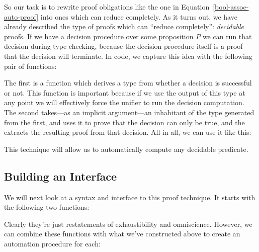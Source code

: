 So our task is to rewrite proof obligations like the one in
Equation~\ref{bool-assoc-auto-proof} into ones which can reduce completely. 
As it turns out, we have already described the type of proofs which can ``reduce
completely'': \emph{decidable} proofs.
If we have a decision procedure over some proposition \(P\) we can run that
decision during type checking, because the decision procedure itself is a proof
that the decision will terminate.
In code, we capture this idea with the following pair of functions:
\begin{multicols}{2}
  \begin{agdalisting}
  \end{agdalisting} \columnbreak
  \begin{agdalisting}
  \end{agdalisting}
\end{multicols}
The first is a function which derives a type from whether a decision is
successful or not.
This function is important because if we use the output of this type at any
point we will effectively force the unifier to run the decision computation.
The second takes---as an implicit argument---an inhabitant of the type generated
from the first, and uses it to prove that the decision can only be true, and the
extracts the resulting proof from that decision.
All in all, we can use it like this:
\begin{agdalisting}
\end{agdalisting}
This technique will allow us to automatically compute any decidable predicate.
\subsection{Building an Interface}
We will next look at a syntax and interface to this proof technique.
It starts with the following two functions:

\begin{minipage}{\linewidth}
  \begin{multicols}{2}
    \begin{agdalisting}
    \end{agdalisting} \columnbreak
    \begin{agdalisting}
    \end{agdalisting}
  \end{multicols}
\end{minipage}
Clearly they're just restatements of exhaustibility and omniscience.
However, we can combine these functions with what we've constructed above to
create an automation procedure for each:

